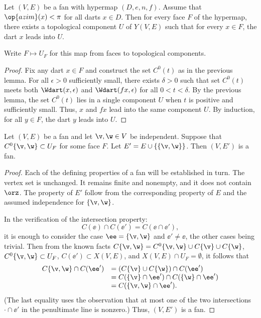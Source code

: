 \begin{lemma} \label{lemma:UF}
Let $(V,E)$ be a fan with hypermap $(D,e,n,f)$.   Assume that $\op{azim}(x)<\pi$ for all darts $x\in D$. Then for every face $F$ of the hypermap, there exists a topological component $U$ of $Y(V,E)$ such that for every $x\in F$, the dart $x$ leads into $U$. 
\end{lemma}
%
%
%

Write $F\mapsto U_F$ for this map from faces to topological components.
%

\begin{proof}  Fix any dart $x\in F$ and construct the set $C^0(t)$ as
in the previous lemma.  
For all $\epsilon>0$
sufficiently small, there exists $\delta>0$ such that set $C^0(t)$ meets
both $\Wdart(x,\epsilon)$ and $\Wdart(f x,\epsilon)$ for all $0<t<\delta$.  
By the previous lemma, the set $C^0(t)$ lies in a single
component $U$ when $t$ is positive and sufficiently small.  
Thus,
$x$ and $f x$ lead into the same component $U$.  By induction, for all
$y\in F$, the dart $y$ leads into $U$.
\end{proof}

\begin{lemma}\label{lemma:add-edge}
Let $(V,E)$ be a fan and let $\v,\w\in V$ be independent.   Suppose that
$C^0\{\v,\w\}\subset U_F$ for some face $F$.  Let $E' = E\cup\{\{\v,\w\}\}$.  Then
$(V,E')$ is a fan.
\end{lemma}

\begin{proof} Each of the defining properties of a fan will be established in turn.
The vertex set is unchanged.  It remains finite and nonempty, and it does not contain $\orz$.  The property  of $E'$ follow from the corresponding property of $E$
and the assumed independence for $\{\v,\w\}$.  

In the verification of the intersection property:
$$
C(\ee)\cap C(\ee') = C(\ee \cap \ee'),
$$
it is enough to consider the case $\ee = \{\v,\w\}$ and $\ee' \ne \ee$, the other cases being trivial.  Then from the known facts $C\{\v,\w\} = C^0\{\v,\w\}\cup C\{\v\}\cup C\{\w\}$, $C^0\{\v,\w\}\subset U_F$,   $C(\ee')\subset X(V,E)$, and $X(V,E)\cap U_F=\emptyset$, it follows that
$$
\begin{array}{rll}
C\{\v,\w\} \cap C(\ee')  &= (C\{\v\} \cup C\{\w\}) \cap C(\ee') \\
  &= C(\{\v\}\cap \ee') \cap C(\{\w\}\cap \ee')\\
  &= C(\{\v,\w\}\cap \ee').
\end{array}
$$
(The last equality uses the observation that at most one of the two intersections $\cdot\cap\ee'$ in the penultimate line is nonzero.)
Thus, $(V,E')$ is a fan.
\end{proof}


